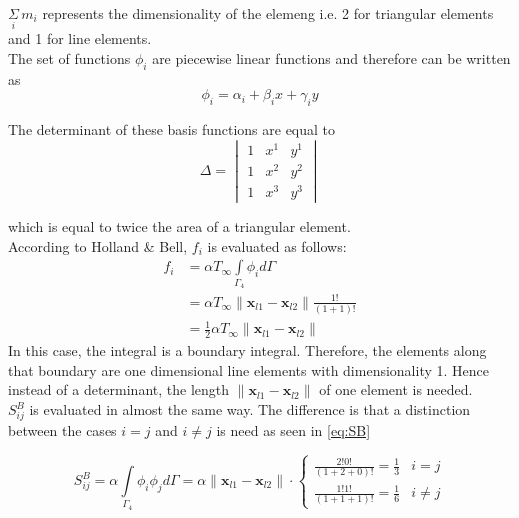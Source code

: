 \documentclass[10pt,a4paper]{article}
\begin{document}
$\underset{i}{\Sigma} \, m_i$ represents the dimensionality of the elemeng i.e. 2 for triangular elements and 1 for line elements.\\

The set of functions $\phi_i $ are piecewise linear functions and therefore can be written as 
\begin{equation*}
\phi_i = \alpha_i + \beta_i x +  \gamma_i y
\end{equation*}

The determinant of these basis functions are equal to 
\begin{equation*}\label{eq:det2}
\Delta = \begin{vmatrix}
1		& x^1 		& y^1\\
1		& x^2 		& y^2\\
1		& x^3 		& y^3
\end{vmatrix}
\end{equation*}

which is equal to twice the area of a triangular element.\\


According to Holland \& Bell, $f_i$ is evaluated as follows:
\begin{align}\label{f}
f_i &=\alpha T_{\infty}\underset{\Gamma_4}{\int}  \phi_i d\Gamma \nonumber\\ 
    &= \alpha T_{\infty}\rVert\textbf{x}_{l1}-\textbf{x}_{l2}\rVert\frac{1!}{(1+1)!}\nonumber\\ 
    &=  \frac{1}{2} \alpha T_{\infty}\rVert\textbf{x}_{l1}-\textbf{x}_{l2}\rVert
\end{align}
In this case, the integral is a boundary integral. Therefore, the elements along that boundary are one dimensional line elements with dimensionality 1. Hence instead of a determinant, the length $\rVert\textbf{x}_{l1}-\textbf{x}_{l2}\rVert$ of one element is needed.\\
 
$ S^B_{ij} $ is evaluated in almost the same way. The difference is that a distinction between the cases $i=j$ and $i\neq j$ is need as seen in \eqref{eq:SB}
 
 \begin{equation}\label{eq:SB}
 S^{B}_{ij} = \alpha\underset{\Gamma_4}{\int}  \phi_i  \phi_jd\Gamma  = \alpha \lVert \textbf{x}_{l1}-\textbf{x}_{l2}\rVert\cdot \begin{cases}
 \frac{2!0!}{(1+2+0)!} = \frac{1}{3} & i =j\\
 \frac{1!1!}{(1+1+1)!} = \frac{1}{6} & i \neq j
 \end{cases}
 \end{equation}
\\
\end{document}
